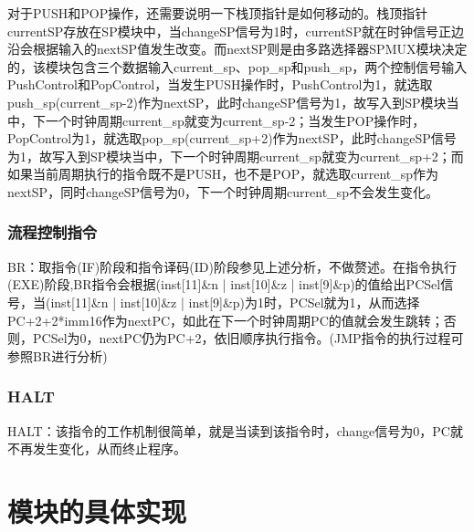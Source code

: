 \documentclass{article}
\begin{document}
对于PUSH和POP操作，还需要说明一下栈顶指针是如何移动的。栈顶指针currentSP存放在SP模块中，当changeSP信号为1时，currentSP就在时钟信号正边沿会根据输入的nextSP值发生改变。而nextSP则是由多路选择器SPMUX模块决定的，该模块包含三个数据输入current\_sp、pop\_sp和push\_sp，两个控制信号输入PushControl和PopControl，当发生PUSH操作时，PushControl为1，就选取push\_sp(current\_sp-2)作为nextSP，此时changeSP信号为1，故写入到SP模块当中，下一个时钟周期current\_sp就变为current\_sp-2；当发生POP操作时，PopControl为1，就选取pop\_sp(current\_sp+2)作为nextSP，此时changeSP信号为1，故写入到SP模块当中，下一个时钟周期current\_sp就变为current\_sp+2；而如果当前周期执行的指令既不是PUSH，也不是POP，就选取current\_sp作为nextSP，同时changeSP信号为0，下一个时钟周期current\_sp不会发生变化。

\subsubsection{流程控制指令}
BR：取指令(IF)阶段和指令译码(ID)阶段参见上述分析，不做赘述。在指令执行(EXE)阶段,BR指令会根据(inst[11]\&n | inst[10]\&z | inst[9]\&p)的值给出PCSel信号，当(inst[11]\&n | inst[10]\&z | inst[9]\&p)为1时，PCSel就为1，从而选择PC+2+2*imm16作为nextPC，如此在下一个时钟周期PC的值就会发生跳转；否则，PCSel为0，nextPC仍为PC+2，依旧顺序执行指令。(JMP指令的执行过程可参照BR进行分析)

\subsubsection{HALT}
HALT：该指令的工作机制很简单，就是当读到该指令时，change信号为0，PC就不再发生变化，从而终止程序。

\section{模块的具体实现}
\end{document}
